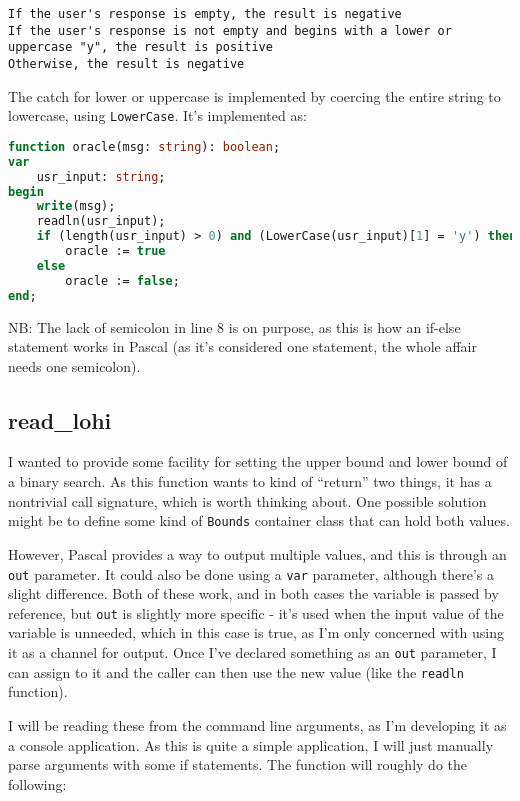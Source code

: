 \documentclass{article}
\begin{document}
\begin{lstlisting}[caption=oracle pseudocode]
If the user's response is empty, the result is negative
If the user's response is not empty and begins with a lower or uppercase "y", the result is positive
Otherwise, the result is negative
\end{lstlisting}

    The catch for lower or uppercase is implemented by coercing the entire
    string to lowercase, using \verb|LowerCase|. It's implemented as:

\begin{lstlisting}[language=Pascal, caption=oracle implementation]
function oracle(msg: string): boolean;
var
    usr_input: string;
begin
    write(msg);
    readln(usr_input);
    if (length(usr_input) > 0) and (LowerCase(usr_input)[1] = 'y') then
        oracle := true
    else
        oracle := false;
end;
\end{lstlisting}

    NB: The lack of semicolon in line 8 is on purpose, as this is how an
    if-else statement works in Pascal (as it's considered one statement, the
    whole affair needs one semicolon).

    \subsection{read\_lohi}
    I wanted to provide some facility for setting the upper bound and lower
    bound of a binary search. As this function wants to kind of ``return'' two
    things, it has a nontrivial call signature, which is worth thinking about.
    One possible solution might be to define some kind of \verb|Bounds|
    container class that can hold both values.
    
    However, Pascal provides a way to output multiple values, and this is
    through an \verb|out| parameter. It could also be done using a \verb|var|
    parameter, although there's a slight difference. Both of these work, and in
    both cases the variable is passed by reference, but \verb|out| is slightly
    more specific - it's used when the input value of the variable is unneeded,
    which in this case is true, as I'm only concerned with using it as a channel
    for output. Once I've declared something as an \verb|out| parameter, I can
    assign to it and the caller can then use the new value (like the
    \verb|readln| function).

    I will be reading these from the command line arguments, as I'm developing
    it as a console application. As this is quite a simple application, I will
    just manually parse arguments with some if statements. The function will
    roughly do the following:
\end{document}
